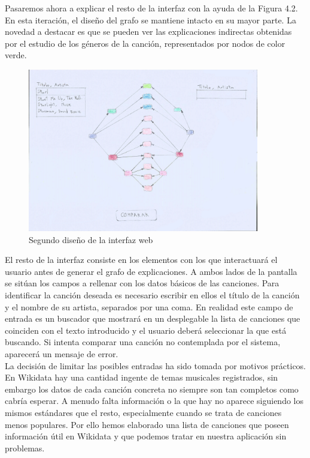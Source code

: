 Pasaremos ahora a explicar el resto de la interfaz con la ayuda de la Figura 4.2. En esta iteración, el diseño del grafo se mantiene intacto en su mayor parte. La novedad a destacar es que se pueden ver las explicaciones indirectas obtenidas por el estudio de los géneros de la canción, representados por nodos de color verde.\\

\begin{figure}[h!]
	\centering
	\includegraphics[width = 0.9\textwidth]{Imagenes/Bitmap/Segunda Interfaz.jpg}
	\caption{Segundo diseño de la interfaz web}
	\label{fig:sampleImage}
\end{figure}

El resto de la interfaz consiste en los elementos con los que interactuará el usuario antes de generar el grafo de explicaciones. A ambos lados de la pantalla se sitúan los campos a rellenar con los datos básicos de las canciones. Para identificar la canción deseada es necesario escribir en ellos el título de la canción y el nombre de su artista, separados por una coma. En realidad este campo de entrada es un buscador que mostrará en un desplegable la lista de canciones que coinciden con el texto introducido y el usuario deberá seleccionar la que está buscando. Si intenta comparar una canción no contemplada por el sistema, aparecerá un mensaje de error.\\

La decisión de limitar las posibles entradas ha sido tomada por motivos prácticos. En Wikidata hay una cantidad ingente de temas musicales registrados, sin embargo los datos de cada canción concreta no siempre son tan completos como cabría esperar. A menudo falta información o la que hay no aparece siguiendo los mismos estándares que el resto, especialmente cuando se trata de canciones menos populares. Por ello hemos elaborado una lista de canciones que poseen información útil en Wikidata y que podemos tratar en nuestra aplicación sin problemas.\\

